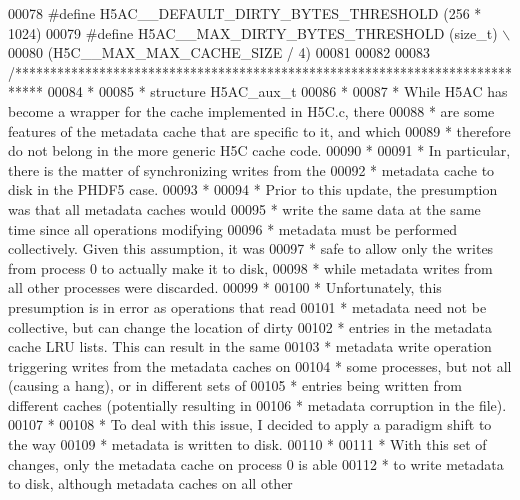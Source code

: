 \begin{DoxyCode}
00078 \textcolor{preprocessor}{#define H5AC\_\_DEFAULT\_DIRTY\_BYTES\_THRESHOLD (256 * 1024)}
00079 \textcolor{preprocessor}{#define H5AC\_\_MAX\_DIRTY\_BYTES\_THRESHOLD     (size\_t) \(\backslash\)}
00080 \textcolor{preprocessor}{                        (H5C\_\_MAX\_MAX\_CACHE\_SIZE / 4)}
00081 
00082 
00083 \textcolor{comment}{/****************************************************************************}
00084 \textcolor{comment}{ *}
00085 \textcolor{comment}{ * structure H5AC\_aux\_t}
00086 \textcolor{comment}{ *}
00087 \textcolor{comment}{ * While H5AC has become a wrapper for the cache implemented in H5C.c, there}
00088 \textcolor{comment}{ * are some features of the metadata cache that are specific to it, and which}
00089 \textcolor{comment}{ * therefore do not belong in the more generic H5C cache code.}
00090 \textcolor{comment}{ *}
00091 \textcolor{comment}{ * In particular, there is the matter of synchronizing writes from the}
00092 \textcolor{comment}{ * metadata cache to disk in the PHDF5 case.}
00093 \textcolor{comment}{ *}
00094 \textcolor{comment}{ * Prior to this update, the presumption was that all metadata caches would}
00095 \textcolor{comment}{ * write the same data at the same time since all operations modifying}
00096 \textcolor{comment}{ * metadata must be performed collectively.  Given this assumption, it was}
00097 \textcolor{comment}{ * safe to allow only the writes from process 0 to actually make it to disk,}
00098 \textcolor{comment}{ * while metadata writes from all other processes were discarded.}
00099 \textcolor{comment}{ *}
00100 \textcolor{comment}{ * Unfortunately, this presumption is in error as operations that read}
00101 \textcolor{comment}{ * metadata need not be collective, but can change the location of dirty}
00102 \textcolor{comment}{ * entries in the metadata cache LRU lists.  This can result in the same}
00103 \textcolor{comment}{ * metadata write operation triggering writes from the metadata caches on}
00104 \textcolor{comment}{ * some processes, but not all (causing a hang), or in different sets of}
00105 \textcolor{comment}{ * entries being written from different caches (potentially resulting in}
00106 \textcolor{comment}{ * metadata corruption in the file).}
00107 \textcolor{comment}{ *}
00108 \textcolor{comment}{ * To deal with this issue, I decided to apply a paradigm shift to the way}
00109 \textcolor{comment}{ * metadata is written to disk.}
00110 \textcolor{comment}{ *}
00111 \textcolor{comment}{ * With this set of changes, only the metadata cache on process 0 is able}
00112 \textcolor{comment}{ * to write metadata to disk, although metadata caches on all other}

\end{DoxyCode}
